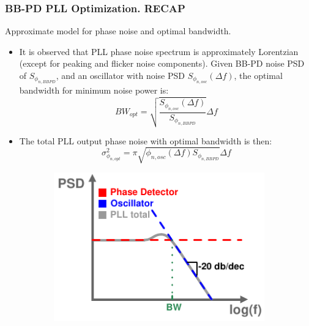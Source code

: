 \documentclass[t, screen, aspectratio=43]{beamer}
\begin{document}
\begin{frame}
	\frametitle{BB-PD PLL Optimization. \color{red}RECAP}
	\begin{block}{Approximate model for phase noise and optimal bandwidth.}
	\tiny
	\begin{itemize}[itemsep=4pt,label=\protect---]
		\item It is observed that PLL phase noise spectrum is approximately Lorentzian (except for peaking and flicker noise components). Given BB-PD noise PSD of $S_{\phi_{n,BBPD}}$, and an oscillator with noise PSD $S_{\phi_{n,osc}}(\Delta f)$, the optimal bandwidth for minimum noise power is:
		\tiny
		\begin{equation}
			BW_{opt} =  \sqrt{\frac{S_{\phi_{n,osc}}(\Delta f)}{S_{\phi_{n,BBPD}}}}\Delta f
		\end{equation}
		\item The total PLL output phase noise with optimal bandwidth is then:
		\tiny
		\begin{equation}
			\sigma^2_{\phi_{n,opt}} =   \pi\sqrt{\phi_{n,osc}(\Delta f)S_{\phi_{n,BBPD}}}\Delta f
		\end{equation}
	\end{itemize}
	\vspace{-3em}
	\begin{figure}[htb!]
	    \centering
	    \begin{subfigure}{0.33\textwidth}
	        \centering
	        \includegraphics[width=1\textwidth, angle=0]{pll_spectrum_lorentzian.pdf}
	    \end{subfigure}%
	    \begin{subfigure}{0.33\textwidth}
	        \centering

\end{subfigure}
\end{figure}
\end{block}
\end{frame}
\end{document}

